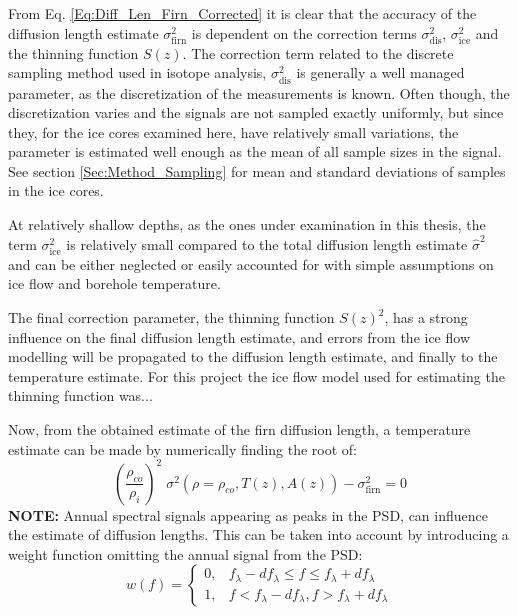 \documentclass[../../CompleteThesis2/Complete_2ndDraft]{subfiles}
\begin{document}
From Eq. \ref{Eq:Diff_Len_Firn_Corrected} it is clear that the accuracy of the diffusion length estimate $\sigma_{\text{firn}}^2$ is dependent on the correction terms $\sigma_{\text{dis}}^2$, $\sigma_{\text{ice}}^2$ and the thinning function $S(z)$. The correction term related to the discrete sampling method used in isotope analysis, $\sigma_{\text{dis}}^2$ is generally a well managed parameter, as the discretization of the measurements is known. Often though, the discretization varies and the signals are not sampled exactly uniformly, but since they, for the ice cores examined here, have relatively small variations, the parameter is estimated well enough as the mean of all sample sizes in the signal. See section \ref{Sec:Method_Sampling} for mean and standard deviations of samples in the ice cores.

At relatively shallow depths, as the ones under examination in this thesis, the term $\sigma_{\text{ice}}^2$ is relatively small compared to the total diffusion length estimate $\hat{\sigma}^2$ and can be either neglected or easily accounted for with simple assumptions on ice flow and borehole temperature. 

The final correction parameter, the thinning function $S(z)^2$, has a strong influence on the final diffusion length estimate, and errors from the ice flow modelling will be propagated to the diffusion length estimate, and finally to the temperature estimate. For this project the ice flow model used for estimating the thinning function was...

Now, from the obtained estimate of the firn diffusion length, a temperature estimate can be made by numerically finding the root of:
\begin{equation}
	\left(\frac{\rho_{co}}{\rho_i}\right)^2\;\sigma^2(\rho=\rho_{co}, T(z),A(z)) - \sigma_{\text{firn}}^2 = 0
	\label{Eq:Firn_Temp_est_Roots}
\end{equation}
\textbf{NOTE:} Annual spectral signals appearing as peaks in the PSD, can influence the  estimate of diffusion lengths. This can be taken into account by introducing a weight function omitting the annual signal from the PSD:
\begin{equation}
	w(f) = \begin{cases}
		0, & f_{\lambda} - d f_{\lambda} \leq f \leq f_{\lambda} + d f_{\lambda} \\
		1, & f < f_{\lambda} - d f_{\lambda}, f > f_{\lambda} + d f_{\lambda}
	\end{cases}
\end{equation}
\end{document}
